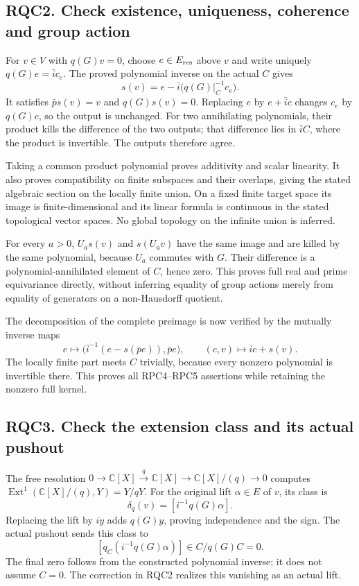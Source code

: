 \subsection{RQC2. Check existence, uniqueness, coherence and group
action}\label{rqc2.-check-existence-uniqueness-coherence-and-group-action}

For \(v\in V\) with \(q(G)v=0\), choose \(e\in E_{\rm res}\) above \(v\)
and write uniquely \(q(G)e=\bar i c_e\). The proved polynomial inverse
on the actual \(C\) gives \[
s(v)=e-\bar i\bigl(q(G)|_C^{-1}c_e\bigr).
\] It satisfies \(\bar p s(v)=v\) and \(q(G)s(v)=0\). Replacing \(e\) by
\(e+\bar i c\) changes \(c_e\) by \(q(G)c\), so the output is unchanged.
For two annihilating polynomials, their product kills the difference of
the two outputs; that difference lies in \(\bar i C\), where the product
is invertible. The outputs therefore agree.

Taking a common product polynomial proves additivity and scalar
linearity. It also proves compatibility on finite subspaces and their
overlaps, giving the stated algebraic section on the locally finite
union. On a fixed finite target space its image is finite-dimensional
and its linear formula is continuous in the stated topological vector
spaces. No global topology on the infinite union is inferred.

For every \(a>0\), \(U_as(v)\) and \(s(U_av)\) have the same image and
are killed by the same polynomial, because \(U_a\) commutes with \(G\).
Their difference is a polynomial-annihilated element of \(C\), hence
zero. This proves full real and prime equivariance directly, without
inferring equality of group actions merely from equality of generators
on a non-Hausdorff quotient.

The decomposition of the complete preimage is now verified by the
mutually inverse maps \[
e\longmapsto
\bigl(\bar i^{-1}(e-s(\bar pe)),\bar pe\bigr),
\qquad
(c,v)\longmapsto\bar ic+s(v).
\] The locally finite part meets \(C\) trivially, because every nonzero
polynomial is invertible there. This proves all RPC4--RPC5 assertions
while retaining the nonzero full kernel.

\subsection{RQC3. Check the extension class and its actual
pushout}\label{rqc3.-check-the-extension-class-and-its-actual-pushout}

The free resolution
\(0\to\mathbb C[X]\xrightarrow q\mathbb C[X]\to\mathbb C[X]/(q)\to0\)
computes \(\operatorname{Ext}^1(\mathbb C[X]/(q),Y)=Y/qY\). For the
original lift \(\alpha\in E\) of \(v\), its class is \[
\delta_q(v)=[i^{-1}q(G)\alpha].
\] Replacing the lift by \(iy\) adds \(q(G)y\), proving independence and
the sign. The actual pushout sends this class to \[
[q_C(i^{-1}q(G)\alpha)]\in C/q(G)C=0.
\] The final zero follows from the constructed polynomial inverse; it
does not assume \(C=0\). The correction in RQC2 realizes this vanishing
as an actual lift.

